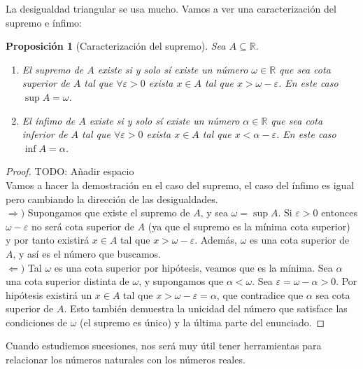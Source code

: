 \documentclass{article}
\newtheorem{prop}{Proposición}
\begin{document}
La desigualdad triangular se usa mucho. Vamos a ver una caracterización del supremo e ínfimo:
\begin{prop}[Caracterización del supremo]
Sea $A\subseteq \mathbb{R}$.
\begin{enumerate}
\item
El supremo de $A$ existe si y solo sí existe un número $\omega \in \mathbb{R}$ que sea cota superior de $A$ tal que $\forall \varepsilon > 0$ exista $x \in A$ tal que $x > \omega - \varepsilon$. En este caso $\sup A = \omega$.

\item
El ínfimo de $A$ existe si y solo sí existe un número $\alpha \in \mathbb{R}$ que sea cota inferior de $A$ tal que $\forall \varepsilon > 0$ exista $x \in A$ tal que $x < \alpha - \varepsilon$. En este caso $\inf A = \alpha$.
\end{enumerate}
\end{prop}

\begin{proof}
	TODO: Añadir espacio\\ 
	Vamos a hacer la demostración en el caso del supremo, el caso del ínfimo es igual pero cambiando la dirección de las desigualdades.\\ 
	$\Rightarrow)$ Supongamos que existe el supremo de $A$, y sea $\omega = \sup A$. Si $\varepsilon > 0$ entonces $\omega - \varepsilon$ no será cota superior de $A$ (ya que el supremo es la mínima cota superior) y por tanto existirá $x \in A$ tal que $x > \omega - \varepsilon$. Además, $\omega$ es una cota superior de $A$, y así es el número que buscamos.\\ 
	$\Leftarrow)$ Tal $\omega$ es una cota superior por hipótesis, veamos que es la mínima. Sea $\alpha$ una cota superior distinta de $\omega$, y supongamos que $\alpha < \omega$. Sea $\varepsilon = \omega - \alpha > 0$. Por hipótesis existirá un $x \in A$ tal que $x > \omega - \varepsilon = \alpha$, que contradice que $\alpha$ sea cota superior de $A$. Esto también demuestra la unicidad del número que satisface las condiciones de $\omega$ (el supremo es único) y la última parte del enunciado.
\end{proof}

Cuando estudiemos sucesiones, nos será muy útil tener herramientas para relacionar los números naturales con los números reales.
\end{document}
